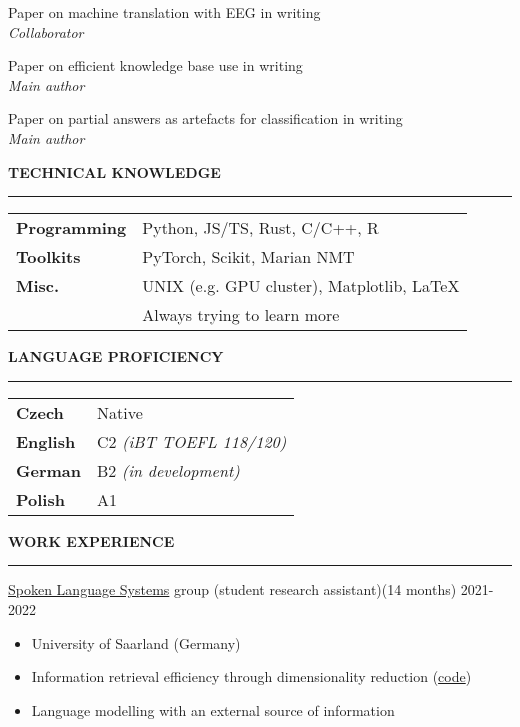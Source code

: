\documentclass[11pt,a4paper]{article} %
\newcommand{\hSection}[1]{
    \medskip
    \MakeUppercase{\bf #1}
    \medskip
    \hrule
}
\newcommand{\hSubsectionB}[3]{
    {#1} \hfill {\footnotesize #2}\hspace{-1cm}\\
    \vspace{-0.2cm} \hspace{-0.17cm}\textit{\footnotesize #3}
    \vspace{0.05cm}
}
\newcommand{\hSubsectionItemize}[3]{
    {#1}\hfill {\footnotesize #2}\hspace{-1cm}\\
    \vspace{-0.5cm}
    \begin{itemize} \footnotesize #3 \end{itemize}
    \vspace{0.3\baselineskip}
}
\begin{document}
\hSubsectionB
{Paper on machine translation with EEG}
{in writing}
{Collaborator}

\hSubsectionB
{Paper on efficient knowledge base use}
{in writing}
{Main author}

\hSubsectionB
{Paper on partial answers as artefacts for classification}
{in writing}
{Main author}

\vspace{0.1\baselineskip}
\begin{minipage}{.62\textwidth}
    \hSection{Technical Knowledge}
    \hspace{-0.3cm}
    \begin{minipage}{\textwidth}
        \vspace{0.15cm}
        \begin{tabular}{ p{2.4cm} l}
        {\bf Programming} & Python, JS/TS, Rust, C/C++, R \\
        {\bf Toolkits} & PyTorch, Scikit, Marian NMT \\
        {\bf Misc.} & UNIX {\small (e.g. GPU cluster)}, Matplotlib, LaTeX \\
        & Always trying to learn more
        \end{tabular}
    \end{minipage}
\end{minipage}
\begin{minipage}{.38\textwidth}
    \hSection{Language Proficiency}
    \hspace{-0.3cm}
    \begin{minipage}{\textwidth}
        \vspace{0.15cm}
        \begin{tabular}{ p{1.3cm} l}
        {\bf Czech} & Native \\
        {\bf English} & C2 \textit{\footnotesize (iBT TOEFL 118/120)} \\
        {\bf German} & B2 \textit{\footnotesize (in development)} \\
        {\bf Polish} & A1
        \end{tabular}
    \end{minipage}
\end{minipage}

\newpage

\vspace{-0.1cm}
\hSection{Work Experience}
\hSubsectionItemize
{\href{https://www.lsv.uni-saarland.de/}{Spoken Language Systems} group (student research assistant)}
{(14 months) 2021-2022}
{
    \item University of Saarland (Germany)
    \item Information retrieval efficiency through dimensionality reduction (\href{https://github.com/zouharvi/kb-shrink}{code})
    \item Language modelling with an external source of information
}
\end{document}
